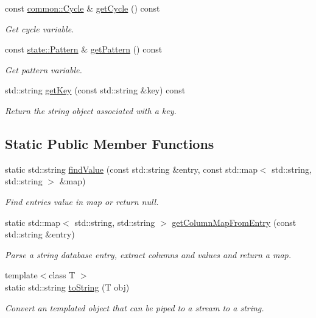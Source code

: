 \begin{DoxyCompactItemize}
const \hyperlink{classcryomesh_1_1common_1_1Cycle}{common\-::\-Cycle} \& \hyperlink{classcryomesh_1_1manager_1_1PatternDatabaseObject_a7be5ec797560ad735e112fdd0bfa8da2}{get\-Cycle} () const 
\begin{DoxyCompactList}\small\item\em \-Get cycle variable. \end{DoxyCompactList}\item 
const \hyperlink{classcryomesh_1_1state_1_1Pattern}{state\-::\-Pattern} \& \hyperlink{classcryomesh_1_1manager_1_1PatternDatabaseObject_a8d5b7d8bab7eddafe7169ad10842e0ac}{get\-Pattern} () const 
\begin{DoxyCompactList}\small\item\em \-Get pattern variable. \end{DoxyCompactList}\item 
std\-::string \hyperlink{classcryomesh_1_1manager_1_1DatabaseObject_a66ded4e1a1bccd65c94922648c7135c5}{get\-Key} (const std\-::string \&key) const 
\begin{DoxyCompactList}\small\item\em \-Return the string object associated with a key. \end{DoxyCompactList}\end{DoxyCompactItemize}
\subsection*{\-Static \-Public \-Member \-Functions}
\begin{DoxyCompactItemize}
\item 
static std\-::string \hyperlink{classcryomesh_1_1manager_1_1DatabaseObject_aa4ef26ce91fea092f146e67add491e0f}{find\-Value} (const std\-::string \&entry, const std\-::map$<$ std\-::string, std\-::string $>$ \&map)
\begin{DoxyCompactList}\small\item\em \-Find entries value in map or return null. \end{DoxyCompactList}\item 
static std\-::map$<$ std\-::string, \*
std\-::string $>$ \hyperlink{classcryomesh_1_1manager_1_1DatabaseObject_a04ce7c34b51e3290c972121cf2f16565}{get\-Column\-Map\-From\-Entry} (const std\-::string \&entry)
\begin{DoxyCompactList}\small\item\em \-Parse a string database entry, extract columns and values and return a map. \end{DoxyCompactList}\item 
{\footnotesize template$<$class T $>$ }\\static std\-::string \hyperlink{classcryomesh_1_1manager_1_1DatabaseObject_a1b37d9d07009ae1c71f644761d36b468}{to\-String} (\-T obj)
\begin{DoxyCompactList}\small\item\em \-Convert an templated object that can be piped to a stream to a string. \end{DoxyCompactList}\end{DoxyCompactItemize}
